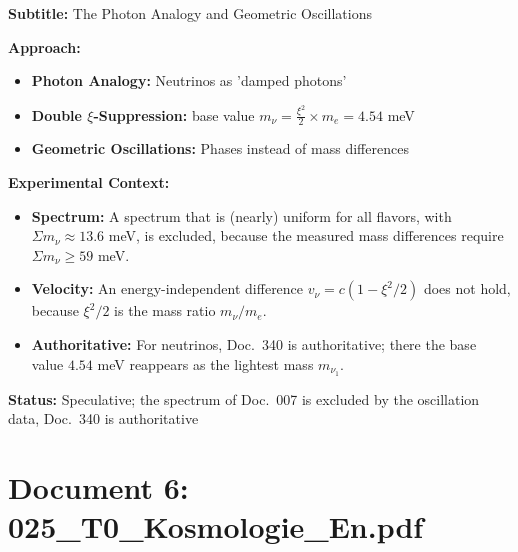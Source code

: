 	\begin{documentbox}
		\textbf{Subtitle:} The Photon Analogy and Geometric Oscillations
		
		\textbf{Approach:}
		\begin{itemize}
			\item \textbf{Photon Analogy:} Neutrinos as 'damped photons'
			\item \textbf{Double $\xi$-Suppression:} base value $m_\nu = \frac{\xi^2}{2} \times m_e = 4.54$ meV
			\item \textbf{Geometric Oscillations:} Phases instead of mass differences
		\end{itemize}
		
		\textbf{Experimental Context:}
		\begin{itemize}
			\item \textbf{Spectrum:} A spectrum that is (nearly) uniform for all flavors, with $\Sigma m_\nu \approx 13.6$ meV, is excluded, because the measured mass differences require $\Sigma m_\nu \geq 59$ meV.
			\item \textbf{Velocity:} An energy-independent difference $v_\nu = c(1 - \xi^2/2)$ does not hold, because $\xi^2/2$ is the mass ratio $m_\nu/m_e$.
			\item \textbf{Authoritative:} For neutrinos, Doc.~340 is authoritative; there the base value $4.54$ meV reappears as the lightest mass $m_{\nu_1}$.
		\end{itemize}
		
		\textbf{Status:} Speculative; the spectrum of Doc.~007 is excluded by the oscillation data, Doc.~340 is authoritative
	\end{documentbox}
	
	\section{Document 6: 025\_T0\_Kosmologie\_En.pdf}
	
